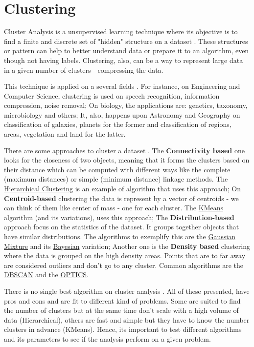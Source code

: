 \section{Clustering}

Cluster Analysis is a unsupervised learning technique where its objective is to find a finite and discrete set of "hidden" structure on a dataset \cite{xu2008clustering}. These structures or pattern can help to better understand data or prepare it to an algorithm, even though not having labels. Clustering, also, can be a way to represent large data in a given number of clusters - compressing the data. 

This technique is applied on a several fields \cite{sabine2001cluster}. For instance, on Engineering and Computer Science, clustering is used on speech recognition, information compression, noise removal; On biology, the applications are: genetics, taxonomy, microbiology and others; It, also, happens upon Astronomy and Geography on classification of galaxies, planets for the former and classification of regions, areas, vegetation and land for the latter.

There are some approaches to cluster a dataset \cite{wikipedia_cluster_analysis}. The \textbf{Connectivity based} one looks for the closeness of two objects, meaning that it forms the clusters based on their distance which can be computed with different ways like the complete (maximum distances) or simple (minimum distance) linkage methods. The \underline{Hierarchical Clustering} is an example of algorithm that uses this approach; On \textbf{Centroid-based} clustering the data is represent by a vector of centroids - we can think of them like center of mass - one for each cluster. The \underline{KMeans} algorithm (and its variations), uses this approach; The \textbf{Distribution-based} approach focus on the statistics of the dataset. It groups together objects that have similar distributions. The algorithms to exemplify this are the \underline{Gaussian Mixture} and its \underline{Bayesian} variation; Another one is the \textbf{Density based} clustering where the data is grouped on the high density areas. Points that are to far away are considered outliers and don't go to any cluster. Common algorithms are the \underline{DBSCAN} and the \underline{OPTICS}.


There is no single best algorithm on cluster analysis \cite{james2013introduction}. All of these presented, have pros and cons and are fit to different kind of problems. Some are suited to find the number of clusters but at the same time don't scale with a high volume of data (Hierarchical), others are fast and simple but they have to know the number clusters in advance (KMeans). Hence, its important to test different algorithms and its parameters to see if the analysis perform on a given problem.


